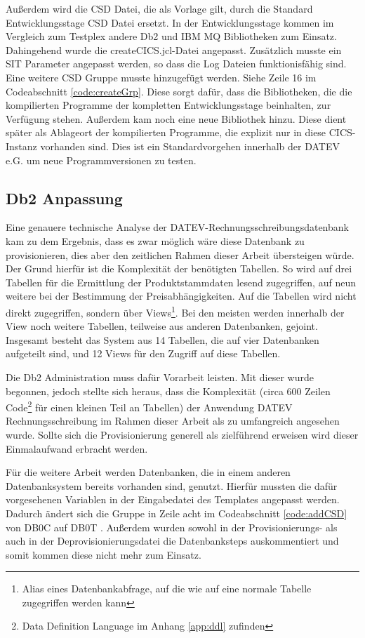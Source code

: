 Außerdem wird die CSD Datei, die als Vorlage gilt, durch die Standard Entwicklungsstage CSD Datei ersetzt.
In der Entwicklungsstage kommen im Vergleich zum Testplex andere Db2 und IBM MQ Bibliotheken zum Einsatz.
Dahingehend wurde die \glqq createCICS.jcl\grqq-Datei angepasst.
Zusätzlich musste ein SIT Parameter angepasst werden, so dass die Log Dateien funktionisfähig sind.
Eine weitere CSD Gruppe musste hinzugefügt werden.
Siehe Zeile 16 im Codeabschnitt \ref{code:createGrp}.
Diese sorgt dafür, dass die Bibliotheken, die die kompilierten Programme der kompletten Entwicklungsstage beinhalten, zur Verfügung stehen.
Außerdem kam noch eine neue Bibliothek hinzu.
Diese dient später als Ablageort der kompilierten Programme, die explizit nur in diese CICS-Instanz vorhanden sind.
Dies ist ein Standardvorgehen innerhalb der DATEV e.G. um neue Programmversionen zu testen.

\subsection{Db2 Anpassung}\label{ssec:db2entw}
Eine genauere technische Analyse der DATEV-Rechnungsschreibungsdatenbank kam zu dem  Ergebnis, dass es zwar möglich wäre diese Datenbank zu provisionieren, dies aber den zeitlichen Rahmen dieser Arbeit übersteigen würde.
Der Grund hierfür ist die Komplexität der benötigten Tabellen.
So wird auf drei Tabellen für die Ermittlung der Produktstammdaten lesend zugegriffen, auf neun weitere bei der Bestimmung der Preisabhängigkeiten.
Auf die Tabellen wird nicht direkt zugegriffen, sondern über Views\footnote{Alias eines Datenbankabfrage, auf die wie auf eine normale Tabelle zugegriffen werden kann}.
Bei den meisten werden innerhalb der View noch weitere Tabellen, teilweise aus anderen Datenbanken, gejoint.
Insgesamt besteht das System aus 14 Tabellen, die auf vier Datenbanken aufgeteilt sind, und 12 Views für den Zugriff auf diese Tabellen.

Die Db2 Administration muss dafür Vorarbeit leisten.
Mit dieser wurde begonnen, jedoch stellte sich heraus, dass die Komplexität (circa 600 Zeilen Code\footnote{Data Definition Language im Anhang \ref{app:ddl} zufinden} für einen kleinen Teil an Tabellen) der Anwendung DATEV Rechnungsschreibung im Rahmen dieser Arbeit als zu umfangreich angesehen wurde.
Sollte sich die Provisionierung generell als zielführend erweisen wird dieser Einmalaufwand erbracht werden.

Für die weitere Arbeit werden Datenbanken, die in einem anderen Datenbanksystem bereits vorhanden sind, genutzt.
Hierfür mussten die dafür vorgesehenen Variablen in der Eingabedatei des Templates angepasst werden.
Dadurch ändert sich die Gruppe in Zeile acht im Codeabschnitt \ref{code:addCSD} von \glqq DB0C \grqq{} auf \glqq DB0T \grqq.
Außerdem wurden sowohl in der Provisionierungs- als auch in der Deprovisionierungsdatei die Datenbanksteps auskommentiert und somit kommen diese nicht mehr zum Einsatz.

